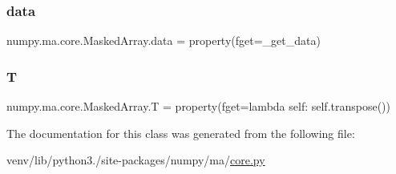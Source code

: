 \subsubsection{\texorpdfstring{data}{data}}
{\footnotesize\ttfamily numpy.\+ma.\+core.\+Masked\+Array.\+data = property(fget=\+\_\+get\+\_\+data)\hspace{0.3cm}{\ttfamily [static]}}

\mbox{\label{classnumpy_1_1ma_1_1core_1_1MaskedArray_aa6b8deec1ef735381ab9342787d4271b}} 
\subsubsection{\texorpdfstring{T}{T}}
{\footnotesize\ttfamily numpy.\+ma.\+core.\+Masked\+Array.\+T = property(fget=lambda self\+: self.\+transpose())\hspace{0.3cm}{\ttfamily [static]}}



The documentation for this class was generated from the following file\+:\begin{DoxyCompactItemize}
\item 
venv/lib/python3./site-\/packages/numpy/ma/\hyperlink{numpy_2ma_2core_8py}{core.\+py}\end{DoxyCompactItemize}
